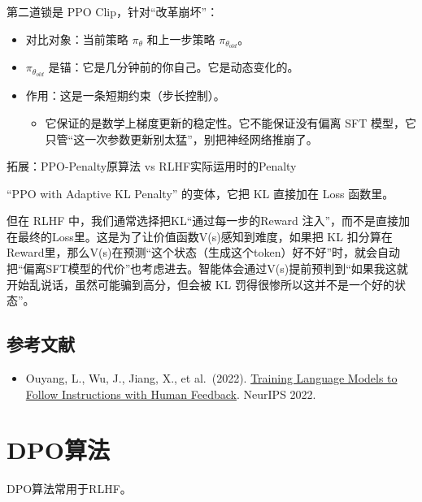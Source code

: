 第二道锁是 PPO Clip，针对``改革崩坏''：

\begin{itemize}
\tightlist
\item
  对比对象：当前策略 \(\pi_\theta\) 和上一步策略 \(\pi_{\theta_{old}}\)。
\item
  \(\pi_{\theta_{old}}\) 是锚：它是几分钟前的你自己。它是动态变化的。
\item
  作用：这是一条短期约束（步长控制）。

  \begin{itemize}
  \tightlist
  \item
    它保证的是数学上梯度更新的稳定性。它不能保证没有偏离 SFT 模型，它只管``这一次参数更新别太猛''，别把神经网络推崩了。
  \end{itemize}
\end{itemize}

拓展：PPO-Penalty原算法 vs RLHF实际运用时的Penalty

``PPO with Adaptive KL Penalty'' 的变体，它把 KL 直接加在 Loss 函数里。

但在 RLHF 中，我们通常选择把KL``通过每一步的Reward 注入''，而不是直接加在最终的Loss里。这是为了让价值函数V(s)感知到难度，如果把 KL 扣分算在Reward里，那么V(s)在预测``这个状态（生成这个token）好不好''时，就会自动把``偏离SFT模型的代价''也考虑进去。智能体会通过V(s)提前预判到``如果我这就开始乱说话，虽然可能骗到高分，但会被 KL 罚得很惨所以这并不是一个好的状态''。

\hypertarget{ux53c2ux8003ux6587ux732e-79}{%
\subsection{参考文献}\label{ux53c2ux8003ux6587ux732e-79}}

\vspace{0.25em}
\begin{itemize}
\tightlist
\item
  Ouyang, L., Wu, J., Jiang, X., et al.~(2022). \href{https://arxiv.org/abs/2203.02155}{Training Language Models to Follow Instructions with Human Feedback}. NeurIPS 2022.
\end{itemize}

\clearpage

\hypertarget{dpoux7b97ux6cd5}{%
\section{DPO算法}\label{dpoux7b97ux6cd5}}

DPO算法常用于RLHF。

